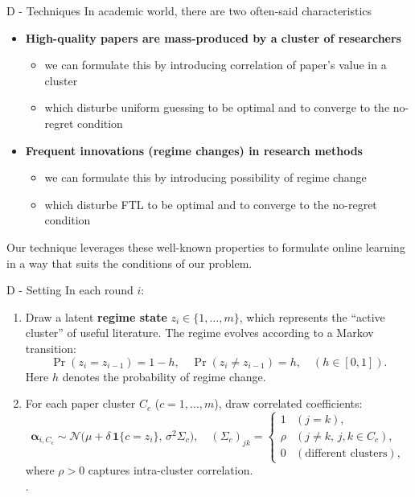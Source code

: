 \documentclass{beamer}
\begin{document}
\begin{frame}{D - Techniques}
    In academic world, there are two often-said characteristics
    \begin{itemize}
        \item \textbf{High-quality papers are mass-produced by a cluster of researchers}
        \begin{itemize}
            \item we can formulate this by introducing correlation of paper's value in a cluster
            \item which disturbe uniform guessing to be optimal and to converge to the no-regret condition
        \end{itemize}
        \item \textbf{Frequent innovations (regime changes) in research methods}
        \begin{itemize}
            \item we can formulate this by introducing possibility of regime change 
            \item which disturbe FTL to be optimal and to converge to the no-regret condition
        \end{itemize}
    \end{itemize}
    Our technique leverages these well-known properties to formulate online learning in a way that suits the conditions of our problem.
\end{frame}

\begin{frame}{D - Setting}
In each round $i$:
\begin{enumerate}
    \item Draw a latent \textbf{regime state} $z_i \in \{1, \dots, m\}$,
          which represents the ``active cluster'' of useful literature.
          The regime evolves according to a Markov transition:
          \[
          \Pr(z_i = z_{i-1}) = 1-h, \quad
          \Pr(z_i \neq z_{i-1}) = h, \quad (h \in [0,1]).
          \]
          Here $h$ denotes the probability of regime change.
    \item For each paper cluster $C_c$ ($c=1,\dots,m$), draw correlated coefficients:
          \[
          \boldsymbol{\alpha}_{i,C_c} \sim 
          \mathcal{N}\!\big(
            \mu + \delta\,\mathbf{1}\{c = z_i\},\,
            \sigma^2 \Sigma_c
          \big), \quad
          (\Sigma_c)_{jk} =
          \begin{cases}
              1 & (j=k),\\
              \rho & (j \neq k,\, j,k \in C_c),\\
              0 & (\text{different clusters}),
          \end{cases}
          \]
          where $\rho>0$ captures intra-cluster correlation.\\.
\end{enumerate}
\end{frame}
\end{document}
